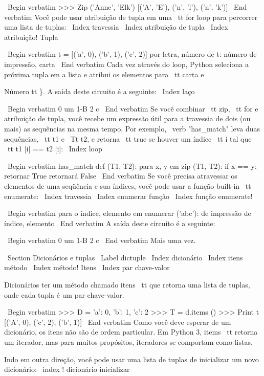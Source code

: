 \documentclass[10pt]{book}
\begin{document}
\begin {itemize}
{{{{{{{{\ Begin {verbatim}
>>> Zip ('Anne', 'Elk')
[('A', 'E'), ('n', 'l'), ('n', 'k')]
\ End {verbatim}
%
Você pode usar atribuição de tupla em uma {\ tt for} loop para percorrer uma lista de
tuplas:
\ Index {travessia}
\ Index {atribuição de tupla}
\ Index {atribuição! Tupla}

\ Begin {verbatim}
t = [('a', 0), ('b', 1), ('c', 2)]
por letra, número de t:
    número de impressão, carta
\ End {verbatim}
%
Cada vez através do loop, Python seleciona a próxima tupla em
a lista e atribui os elementos para {\ tt carta} e 
{Número tt \}. A saída deste circuito é a seguinte:
\ Index {laço}

\ Begin {verbatim}
0 um
1-B
2 c
\ End {verbatim}
%
Se você combinar {\ tt zip}, {\ tt for} e atribuição de tupla, você recebe um
expressão útil para a travessia de dois (ou mais) as sequências na mesma
tempo. Por exemplo, \ verb "has_match" leva duas sequências, {\ tt t1} e
{\ Tt t2}, e retorna {\ tt true} se houver um índice {\ tt i}
tal que {\ tt t1 [i] == t2 [i]}:
\ Index {loop}

\ Begin {verbatim}
has_match def (T1, T2):
    para x, y em zip (T1, T2):
        if x == y:
            retornar True
    retornará False
\ End {verbatim}
%
Se você precisa atravessar os elementos de uma seqüência e sua
índices, você pode usar a função built-in {\ tt enumerate}:
\ Index {travessia}
\ Index {enumerar função}
\ Index {função enumerate!}

\ Begin {verbatim}
para o índice, elemento em enumerar ('abc'):
    de impressão de índice, elemento
\ End {verbatim}
%
A saída deste circuito é a seguinte:

\ Begin {verbatim}
0 um
1-B
2 c
\ End {verbatim}
%
Mais uma vez.


\ Section {Dicionários e tuplas}
\ Label {} dictuple
\ Index {} dicionário
\ Index {itens método}
\ Index {método! Itens}
\ Index {par chave-valor}

Dicionários ter um método chamado {itens \ tt} que retorna uma lista de
tuplas, onde cada tupla é um par chave-valor.

\ Begin {verbatim}
>>> D = {'a': 0, 'b': 1, 'c': 2}
>>> T = d.items ()
>>> Print t
[('A', 0), ('c', 2), ('b', 1)]
\ End {verbatim}
%
Como você deve esperar de um dicionário, os itens não são de
ordem particular. Em Python 3, {items \ tt} retorna um iterador,
mas para muitos propósitos, iteradores se comportam como listas.

Indo em outra direção, você pode usar uma lista de tuplas de
inicializar um novo dicionário: \ index {! dicionário inicializar}

}}}}}}}}}
\end{itemize}
\end{document}
